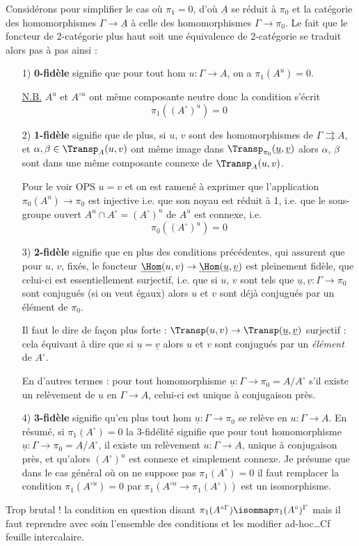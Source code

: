 Considérons pour simplifier le cas où $\pi_1 = 0$, d'où $\underline{A}$ se réduit à $\pi_0$ et la catégorie des homomorphismes $\Gamma \to \underline{A}$ à celle des homomorphismes $\Gamma \to \pi_0$. Le fait que le foncteur de 2-catégorie plus haut soit une équivalence de 2-catégorie se traduit alors pas à pas ainsi :
\begin{enumerate}
    \item[1)] {\bf 0-fidèle} signifie que pour tout hom $u: \Gamma \to A$, on a $\pi_1(A^u) = 0$.
    
    \underline{N.B.} $A^u$ et $A^{\circ u}$ ont même composante neutre donc la condition s'écrit
    $$
    \boxed{\pi_1((A^\circ)^u) = 0}
    $$
    \item[2)] {\bf 1-fidèle} signifie que de plus, si $u$, $v$ sont des homomorphismes de $\Gamma \rightrightarrows A$, et $\alpha, \beta \in \Transp_A (u, v)$ ont même image dans $\Transp_{\pi_0}(\underline{u}, \underline{v})$ alors $\alpha$, $\beta$ sont dans une même composante connexe de $\Transp_A(u, v)$.
    
    Pour le voir OPS $u = v$ et on est ramené à exprimer que l'application $\pi_0 (A^u) \to \pi_0$ est injective i.e. que son noyau est réduit à 1, i.e. que le sous-groupe ouvert $A^u \cap A^\circ = (A^\circ)^u$ de $A^u$ est connexe, i.e.
    $$
    \boxed{\pi_0 ((A^\circ)^u) = 0}
    $$
    \item[3)] {\bf 2-fidèle} signifie que en plus des conditions précédentes, qui assurent que pour $u$, $v$, fixés, le foncteur $\underline{\Hom}(u, v) \to \underline{\Hom}(\underline{u}, \underline{v})$ est pleinement fidèle, que celui-ci est essentiellement surjectif, i.e. que si $u$, $v$ sont tels que $\underline{u}, \underline{v}: \Gamma \to \pi_0$ sont conjugués (si on veut égaux) alors $u$ et $v$ sont déjà conjugués par un élément de $\pi_0$.
    
    Il faut le dire de fa\c{c}on plus forte : $\Transp(u, v) \to \Transp(\underline{u}, \underline{v})$ surjectif : cela équivaut à dire que si $\underline{u} = \underline{v}$ alors $u$ et $v$ sont conjugués par un \emph{élément} de $A^\circ$.
    
    En d'autres termes : pour tout homomorphisme $\underline{u}: \Gamma \to \pi_0 = A/A^\circ$ s'il existe un relèvement de $u$ en $\Gamma \to A$, celui-ci est unique à conjugaison près.
    \item[4)] {\bf 3-fidèle} signifie qu'en plus tout hom $\underline{u}: \Gamma \to \pi_0$ se relève en $u: \Gamma \to A$. En résumé, si $\pi_1(A^\circ) = 0$ la 3-fidélité signifie que pour tout homomorphisme $\underline{u}: \Gamma \to \pi_0 = A/A^\circ$, il existe un relèvement $u: \Gamma \to A$, unique à conjugaison près, et qu'alors $(A^\circ)^u$ est connexe et simplement connexe. Je présume que dans le cas général où on ne suppose pas $\pi_1(A^\circ) = 0$ il faut remplacer la condition $\pi_1(A^{\circ u}) = 0$ par $\pi_1(A^{\circ u} \to \pi_1(A^\circ))$ est un isomorphisme.  
\end{enumerate}
Trop brutal ! la condition en question disant $\pi_1 (A^{\circ \Gamma}) \isommap \pi_1(A^\circ)^\Gamma$ mais il faut reprendre avec soin l'ensemble des conditions et les modifier ad-hoc\dots Cf feuille intercalaire.

